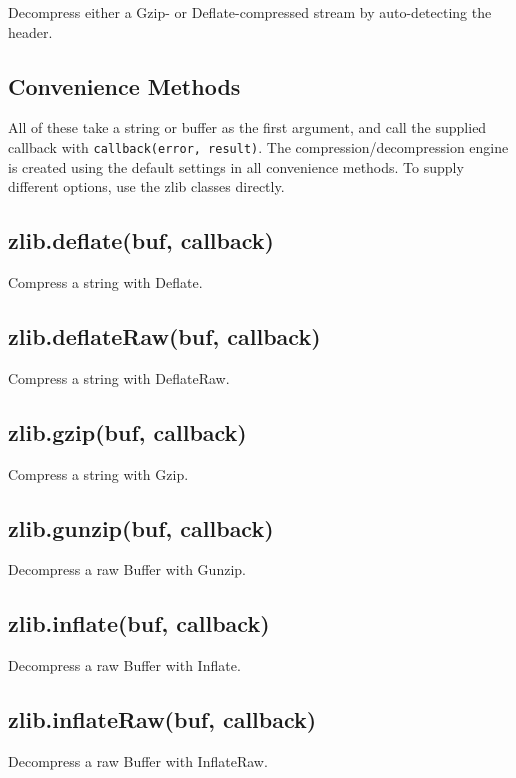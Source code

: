 Decompress either a Gzip- or Deflate-compressed stream by auto-detecting
the header.

\subsection{Convenience Methods}

All of these take a string or buffer as the first argument, and call the
supplied callback with \texttt{callback(error, result)}. The
compression/decompression engine is created using the default settings
in all convenience methods. To supply different options, use the zlib
classes directly.

\subsection{zlib.deflate(buf, callback)}

Compress a string with Deflate.

\subsection{zlib.deflateRaw(buf, callback)}

Compress a string with DeflateRaw.

\subsection{zlib.gzip(buf, callback)}

Compress a string with Gzip.

\subsection{zlib.gunzip(buf, callback)}

Decompress a raw Buffer with Gunzip.

\subsection{zlib.inflate(buf, callback)}

Decompress a raw Buffer with Inflate.

\subsection{zlib.inflateRaw(buf, callback)}

Decompress a raw Buffer with InflateRaw.

